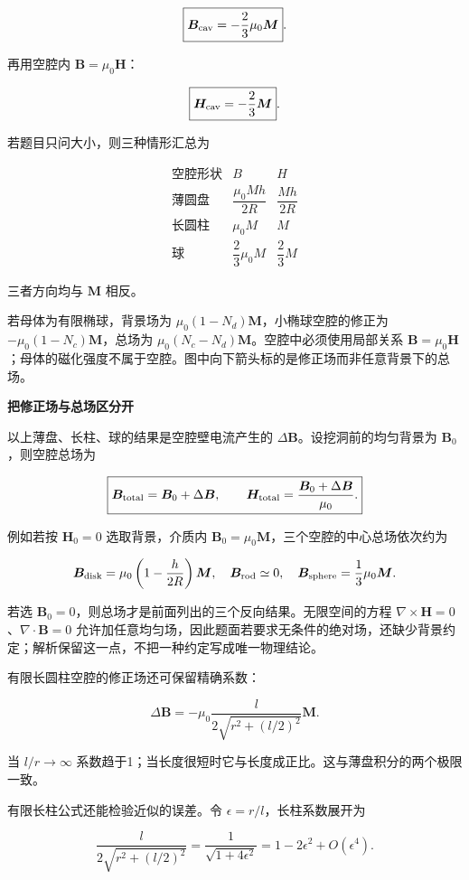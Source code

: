 \documentclass[12pt,a4paper,UTF8]{ctexart}
\begin{document}
\[\boxed{\bm B_{\rm cav}=-\frac23\mu_0\bm M}.\]

再用空腔内 \(\bm B=\mu_0\bm H\)：

\[\boxed{\bm H_{\rm cav}=-\frac23\bm M}.\]

若题目只问大小，则三种情形汇总为

\[\boxed{
\begin{array}{c|cc}
\text{空腔形状}&B&H\\ \hline
\text{薄圆盘}&\dfrac{\mu_0Mh}{2R}&\dfrac{Mh}{2R}\\[6pt]
\text{长圆柱}&\mu_0M&M\\[4pt]
\text{球}&\dfrac23\mu_0M&\dfrac23M
\end{array}}\]

三者方向均与 \(\bm M\) 相反。

若母体为有限椭球，背景场为 \(\mu_0(1-N_d)\bm M\)，小椭球空腔的修正为
\(-\mu_0(1-N_c)\bm M\)，总场为
\(\mu_0(N_c-N_d)\bm M\)。空腔中必须使用局部关系
\(\bm B=\mu_0\bm H\)；母体的磁化强度不属于空腔。图中向下箭头标的是修正场而非任意背景下的总场。

\textbf{把修正场与总场区分开}

以上薄盘、长柱、球的结果是空腔壁电流产生的
\(\Delta\bm B\)。设挖洞前的均匀背景为 \(\bm B_0\)，则空腔总场为

\[\boxed{\bm B_{\rm total}=\bm B_0+\Delta\bm B,\qquad
\bm H_{\rm total}=\frac{\bm B_0+\Delta\bm B}{\mu_0}.}\]

例如若按 \(\bm H_0=0\) 选取背景，介质内
\(\bm B_0=\mu_0\bm M\)，三个空腔的中心总场依次约为

\[\bm B_{\rm disk}=\mu_0\left(1-\frac h{2R}\right)\bm M,
\quad\bm B_{\rm rod}\simeq0,
\quad\bm B_{\rm sphere}=\frac13\mu_0\bm M.\]

若选 \(\bm B_0=0\)，则总场才是前面列出的三个反向结果。无限空间的方程
\(\nabla\times\bm H=0\)、\(\nabla\cdot\bm B=0\)
允许加任意均匀场，因此题面若要求无条件的绝对场，还缺少背景约定；解析保留这一点，不把一种约定写成唯一物理结论。

有限长圆柱空腔的修正场还可保留精确系数：

\[\Delta\bm B=-\mu_0\frac{l}{2\sqrt{r^2+(l/2)^2}}\bm M.\]

当 \(l/r\to\infty\)
系数趋于1；当长度很短时它与长度成正比。这与薄盘积分的两个极限一致。

有限长柱公式还能检验近似的误差。令 \(\epsilon=r/l\)，长柱系数展开为

\[\frac{l}{2\sqrt{r^2+(l/2)^2}}
=\frac1{\sqrt{1+4\epsilon^2}}
=1-2\epsilon^2+O(\epsilon^4).\]
\end{document}

